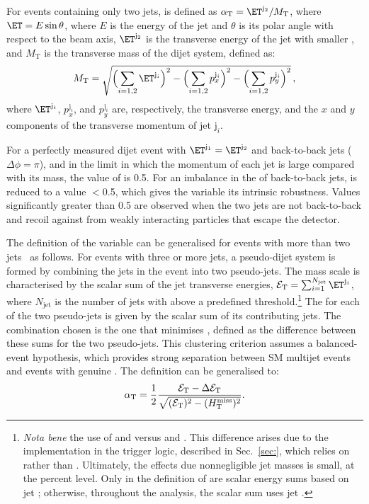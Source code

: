 For events containing only two jets, \alphat is defined as $\alphat =
\ET^{\mathrm{j}_2}/M_\mathrm{T}$, where $\ET= E\sin\theta$, where $E$
is the energy of the jet and $\theta$ is its polar angle with respect
to the beam axis, $\ET^{\mathrm{j}_2}$ is the transverse energy of the
jet with smaller \ET, and $M_\mathrm{T}$ is the transverse mass of the
dijet system, defined as:
\begin{equation}
  \label{eq:mt}
  M_\mathrm{T} = \sqrt{ \Bigl( \sum_{i=1,2} \ET^{\mathrm{j}_i}
    \Bigr)^2 - \Bigl( \sum_{i=1,2} p_x^{\mathrm{j}_i} \Bigr)^2 - \Bigl(
      \sum_{i=1,2} p_y^{\mathrm{j}_i} \Bigr)^2}\, ,
\end{equation}
where $\ET^{\mathrm{j}_i}$, $p_x^{\mathrm{j}_i}$, and
$p_y^{\mathrm{j}_i}$ are, respectively, the transverse energy, and the
$x$ and $y$ components of the transverse momentum of jet
$\mathrm{j}_i$.

For a perfectly measured dijet event with $\ET^{\mathrm{j_1}} =
\ET^{\mathrm{j_2}}$ and back-to-back jets ($\Delta\phi = \pi$), and in
the limit in which the momentum of each jet is large compared with its
mass, the value of \alphat is 0.5. For an imbalance in the \ET of
back-to-back jets, \alphat is reduced to a value $<$0.5, which gives
the variable its intrinsic robustness. Values significantly greater
than 0.5 are observed when the two jets are not back-to-back and
recoil against \ptvecmiss from weakly interacting particles that
escape the detector.

The definition of the \alphat variable can be generalised for events
with more than two jets~\cite{RA1Paper} as follows. For events with
three or more jets, a pseudo-dijet system is formed by combining the
jets in the event into two pseudo-jets. The mass scale is
characterised by the scalar sum of the jet transverse energies,
$\scalst = \sum_{i=1}^{N_\text{jet}} \ET^{\mathrm{j}_i}$, where
$N_\text{jet}$ is the number of jets with \ET above a predefined
threshold.\footnote{{\it Nota bene} the use of \Et and \scalst versus
  \Pt and \scalht. This difference arises due to the implementation in
  the trigger logic, described in Sec.~\ref{sec:}, which relies on \Et
  rather than \Pt. Ultimately, the effects due nonnegligible jet
  masses is small, at the percent level. Only in the definition of
  \alphat are scalar energy sums based on jet \Et; otherwise,
  throughout the analysis, the scalar sum \scalht uses jet \Pt.} The
\scalst for each of the two pseudo-jets is given by the scalar \ET sum
of its contributing jets. The combination chosen is the one that
minimises \dst, defined as the difference between these sums for the
two pseudo-jets.  This clustering criterion assumes a balanced-event
hypothesis, which provides strong separation between SM multijet
events and events with genuine \ptvecmiss. The \alphat definition can
be generalised to:
\begin{equation}
  \label{eq:alphat}
  \alpha_{\text{T}} = \frac{1}{2} \frac{\mathcal{E}_\mathrm{T} -
    \Delta\mathcal{E}_\mathrm{T}}{\sqrt{(\mathcal{E}_\mathrm{T})^2 - (\mbox{$H_{\rm T}^{\rm miss}$})^2}}.
\end{equation}

